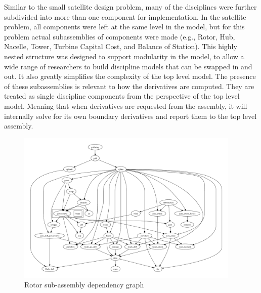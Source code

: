 \documentclass[]{aiaa-tc} %
\begin{document}
    Similar to the small satellite design problem, many of the disciplines were further
    subdivided into more than one component for implementation. In the
    satellite problem, all components were left at the same level in the model, but for this problem 
    actual subassemblies of components were made (e.g., Rotor, Hub, Nacelle, Tower, Turbine Capital Cost, 
    and Balance of Station). This highly nested structure was designed to support modularity in the model, 
    to allow a wide range of researchers to build discipline models that can be swapped in and out. 
    It also greatly simplifies the complexity of the top level model. 
    The presence of these subassemblies is relevant to how the derivatives are computed. 
    They are treated as single discipline components from the perspective of the top level model. 
    Meaning that when derivatives are requested from the assembly, it will internally solve 
    for its own boundary derivatives and report them to the top level assembly. 


    \begin{figure}[!htbp]
        \centering
        \includegraphics[width=0.95\textwidth]{images/rotor_depgraph}
        \caption{Rotor sub-assembly dependency graph}
        \label{fig:wt_sub_depgraph}
    \end{figure}
\end{document}

